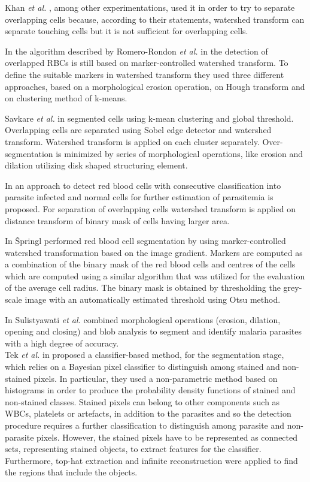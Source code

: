 \documentclass[sensors,review,submit,moreauthors,pdftex,10pt,a4paper]{mdpi}
\begin{document}
Khan \emph{et al.} \cite{Khan2011}, among other experimentations, used it in order to try to separate overlapping cells because, according to their statements, watershed transform can separate touching cells but it is not sufficient for overlapping cells.

In the algorithm described by Romero-Rondon \emph{et al.} in \cite{Romero2016} the detection of overlapped RBCs is still based on marker-controlled watershed transform. To define the suitable markers in watershed transform they used three different approaches, based on a morphological erosion operation, on Hough transform and on clustering method of k-means.

Savkare \emph{et al.} in \cite{Savkare2015} segmented cells using k-mean clustering and global threshold. Overlapping cells are separated using Sobel edge detector and watershed transform. Watershed transform is applied on each cluster separately. Over-segmentation is minimized by series of morphological operations, like erosion and dilation utilizing disk shaped structuring element.

In \cite{Savkare2011a} an approach  to detect red blood cells with consecutive classification into parasite infected and normal cells for further estimation of parasitemia is proposed. For separation of overlapping cells watershed transform is applied on distance transform of binary mask of cells having larger area.

In \cite{Springl2009} {\v{S}}pringl performed red blood cell segmentation by using marker-controlled watershed transformation based on the image gradient. Markers are computed as a combination of the binary mask of the red blood cells and centres of the cells which are computed using a similar algorithm that was utilized for the evaluation of the average cell radius. The binary mask is obtained by thresholding the grey-scale image with an automatically estimated threshold using Otsu method\cite{Otsu1975}.

In \cite{Sulist2015} Sulistyawati \emph{et al.} combined morphological operations (erosion, dilation, opening and closing) and blob analysis to segment and identify malaria parasites with a high degree of accuracy.\\

Tek \emph{et al.} in \cite{Tek2006} proposed a classifier-based method, for the segmentation stage, which relies on a Bayesian pixel classifier to distinguish among stained and non-stained pixels. In particular, they used a non-parametric method based on histograms in order to produce the probability density functions of stained and non-stained classes. Stained pixels can belong to other components such as WBCs, platelets or artefacts, in addition to the parasites and so the detection procedure requires a further classification to distinguish among parasite and non-parasite pixels. However, the stained pixels have to be represented as connected sets, representing stained objects, to extract features for the classifier. Furthermore, top-hat extraction and infinite reconstruction were applied to find the regions that include the objects.
\end{document}
